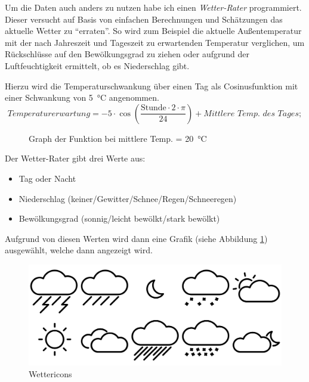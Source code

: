 Um die Daten auch anders zu nutzen habe ich einen \emph{Wetter-Rater} programmiert. Dieser versucht auf Basis von einfachen Berechnungen und Schätzungen das aktuelle Wetter zu \enquote{erraten}. So wird zum Beispiel die aktuelle Außentemperatur mit der nach Jahreszeit und Tageszeit zu erwartenden Temperatur verglichen, um Rückschlüsse auf den Bewölkungsgrad zu ziehen oder aufgrund der Luftfeuchtigkeit ermittelt, ob es Niederschlag gibt.

Hierzu wird die Temperaturschwankung über einen Tag als Cosinusfunktion mit einer Schwankung von \SI{5}{\degreeCelsius} angenommen.
$$ \textit{Temperaturerwartung} = -5 \cdot \cos\left(\frac{\text{Stunde}\cdot 2 \cdot \pi }{24}\right) + \textit{Mittlere Temp. des Tages}; $$
\begin{figure}[h]
\centering
{}
\caption{Graph der Funktion bei mittlere Temp. = \SI{20}{\degreeCelsius}}
\end{figure}


Der Wetter-Rater gibt drei Werte aus:
\begin{itemize}
	\item Tag oder Nacht
	\item Niederschlag (keiner/Gewitter/Schnee/Regen/Schneeregen)
	\item Bewölkungsgrad (sonnig/leicht bewölkt/stark bewölkt)
\end{itemize}
Aufgrund von diesen Werten wird dann eine Grafik (siehe Abbildung \ref{fig:wettericons}) ausgewählt, welche dann angezeigt wird.

\begin{figure}
  \centering
     \includegraphics[width=\textwidth]{figures/wettericons.png}
  \caption{Wettericons}
  \label{fig:wettericons}
\end{figure}

